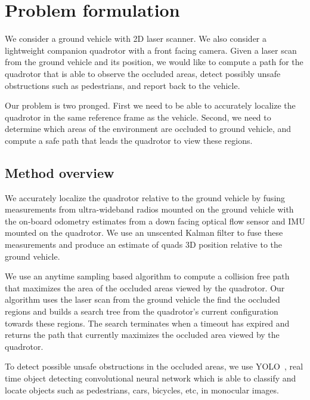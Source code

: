 
\section{Problem formulation}

We consider a ground vehicle with 2D laser scanner. We also consider a
lightweight companion quadrotor with a front facing camera. Given a laser scan
from the ground vehicle and its position, we would like to compute a path for
the quadrotor that is able to observe the occluded areas, detect possibly
unsafe obstructions such as pedestrians, and report back to the vehicle.

Our problem is two pronged. First we need to be able to accurately localize the
quadrotor in the same reference frame as the vehicle. Second, we need to
determine which areas of the environment are occluded to ground vehicle, and
compute a safe path that leads the quadrotor to view these regions.

%
%
%

\subsection{Method overview}

We accurately localize the quadrotor relative to the ground vehicle by fusing
measurements from ultra-wideband radios mounted on the ground vehicle with the
on-board odometry estimates from a down facing optical flow sensor and IMU
mounted on the quadrotor. We use an unscented Kalman filter to fuse these
measurements and produce an estimate of quads 3D position relative to the
ground vehicle.

We use an anytime sampling based algorithm to compute a collision free path
that maximizes the area of the occluded areas viewed by the quadrotor. Our
algorithm uses the laser scan from the ground vehicle the find the occluded
regions and builds a search tree from the quadrotor's current configuration
towards these regions. The search terminates when a timeout has expired and
returns the path that currently maximizes the occluded area viewed by the
quadrotor.

To detect possible unsafe obstructions in the occluded areas, we use
YOLO~\cite{yolo}, real time object detecting convolutional neural network which
is able to classify and locate objects such as pedestrians, cars, bicycles,
etc, in monocular images.
